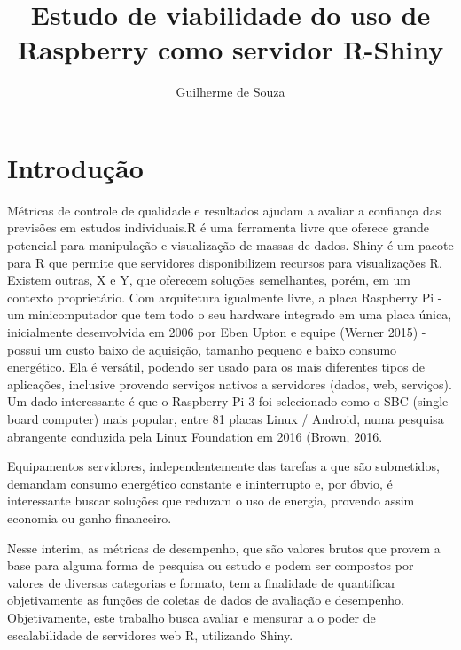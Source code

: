 \documentclass[12pt,english,brazil]{article}
\title{Estudo de viabilidade do uso de Raspberry como servidor R-Shiny}
\author{Guilherme de Souza\inst{1}}
\begin{document}
 

\maketitle
    
\en
\begin{abstract}


\end{abstract}

\br
\begin{resumo} 


\end{resumo}



\section{Introdução}

Métricas de controle de qualidade e resultados ajudam a avaliar a confiança das previsões em estudos individuais.R é uma ferramenta livre que oferece grande potencial para manipulação e visualização de massas de dados. Shiny é um pacote para R que permite que servidores disponibilizem recursos para visualizações R. Existem outras, X e Y, que oferecem soluções semelhantes, porém, em um contexto proprietário.  Com arquitetura igualmente livre, a placa Raspberry Pi - um minicomputador que tem todo o seu hardware integrado em uma placa única, inicialmente desenvolvida em 2006 por Eben Upton e equipe (Werner 2015) - possui um custo baixo de aquisição, tamanho pequeno e baixo consumo energético. Ela é versátil, podendo ser usado para os mais diferentes tipos de aplicações, inclusive provendo serviços nativos a servidores (dados, web, serviços). Um dado interessante é que o Raspberry Pi 3 foi selecionado como o SBC (single board computer) mais popular, entre 81 placas Linux / Android, numa pesquisa abrangente conduzida pela Linux Foundation em 2016 (Brown, 2016.

Equipamentos servidores, independentemente das tarefas a que são submetidos, demandam consumo energético constante e ininterrupto e, por óbvio, é interessante buscar soluções que reduzam o uso de energia, provendo assim economia ou ganho financeiro.

Nesse interim, as métricas de desempenho, que são valores brutos que provem a base para alguma forma de pesquisa ou estudo e podem ser compostos por valores de diversas categorias e formato, tem a finalidade de quantificar objetivamente as funções de coletas de dados de avaliação e desempenho. Objetivamente, este trabalho busca avaliar e mensurar a o poder de escalabilidade de servidores web R, utilizando Shiny.
\end{document}
